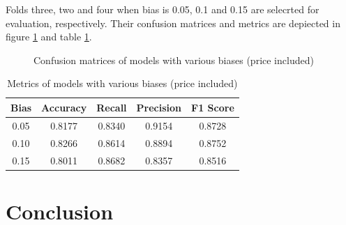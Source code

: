 \documentclass[12pt,twoside]{report}
\begin{document}
Folds three, two and four when bias is 0.05, 0.1 and 0.15 are selecrted for evaluation, respectively. Their confusion matrices and metrics are depiected in figure \ref{status_bias_cm} and table \ref{status_bias_metrics}.

\begin{figure}[!htbp]
	\centering
	\hfill
	\hfill
	\caption{Confusion matrices of models with various biases (price included)}
	\label{status_bias_cm}
\end{figure}

\begin{table}[!htbp]
	\centering
	\caption{Metrics of models with various biases (price included)}
	\label{status_bias_metrics}
	\begin{tabular}{| c | c | c | c | c |}
		\hline
		Bias & Accuracy & Recall & Precision & F1 Score \\
		\hline
		0.05 & 0.8177 & 0.8340 & 0.9154 & 0.8728 \\
		\hline
		0.10 & 0.8266 & 0.8614 & 0.8894 & 0.8752 \\
		\hline
		0.15 & 0.8011 & 0.8682 & 0.8357 & 0.8516 \\
		\hline
	\end{tabular}
\end{table}

\chapter{Conclusion}




\end{document}
